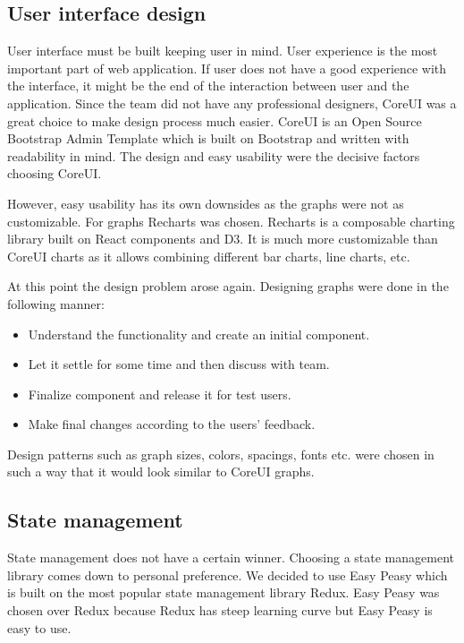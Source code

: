 \subsection{User interface design}\label{subsec:user-interface-design}
User interface must be built keeping user in mind.
User experience is the most important part of web application.
If user does not have a good experience with the interface, it might be the end of the interaction between user and the application.
Since the team did not have any professional designers, CoreUI was a great choice to make design process much easier.
CoreUI is an Open Source Bootstrap Admin Template which is built on Bootstrap and written with readability in mind.
The design and easy usability were the decisive factors choosing CoreUI.

However, easy usability has its own downsides as the graphs were not as customizable.
For graphs Recharts was chosen.
Recharts is a composable charting library built on React components and D3.
It is much more customizable than CoreUI charts as it allows combining different bar charts, line charts, etc.
\cite{recharts-readme}

At this point the design problem arose again.
Designing graphs were done in the following manner:
\begin{itemize}
    \item Understand the functionality and create an initial component.
    \item Let it settle for some time and then discuss with team.
    \item Finalize component and release it for test users.
    \item Make final changes according to the users' feedback.
\end{itemize}
Design patterns such as graph sizes, colors, spacings, fonts etc. were chosen in such a way that it would look similar to CoreUI graphs.

\subsection{State management}\label{subsec:state-management}
State management does not have a certain winner.
Choosing a state management library comes down to personal preference.
We decided to use Easy Peasy which is built on the most popular state management library Redux.
Easy Peasy was chosen over Redux because Redux has steep learning curve but Easy Peasy is easy to use.
